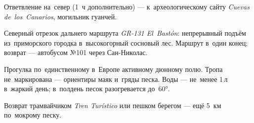 \begin{detour}
Ответвление на~север (1~ч дополнительно) --- к~археологическому
сайту \textit{Cuevas de~los~Canarios}, могильник гуанчей.
\end{detour}



\noindent Северный отрезок дальнего маршрута \textit{GR-131 El~Bastón}:
непрерывный подъём из~приморского городка в~высокогорный
сосновый лес. Маршрут в~один конец; возврат --- автобусом №101
через Сан-Николас.




\noindent Прогулка по~единственному в~Европе активному дюнному
полю. Тропа не~маркирована --- ориентиры маяк и~гряды песка.
Воды --- не~менее 1\,л в~жаркий день; в~полдень песок разогревается
до~60°.




\begin{detour}
Возврат трамвайчиком \textit{Tren Turístico} или пешком берегом ---
ещё 5~км по~мокрому песку.
\end{detour}
